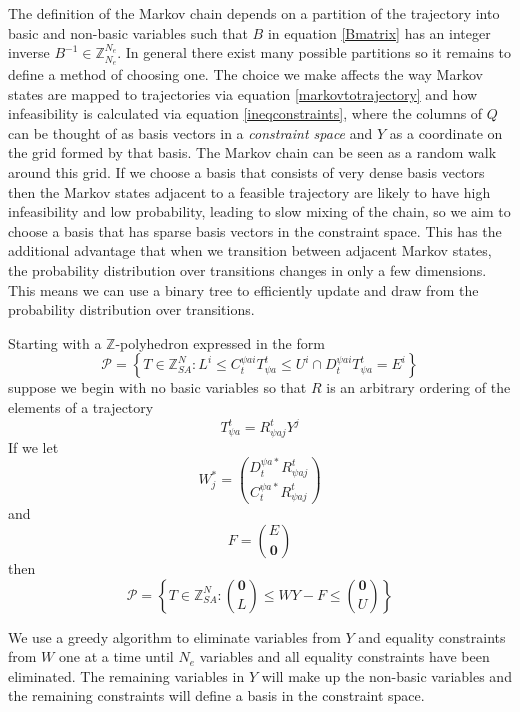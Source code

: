 \documentclass{article}
\begin{document}
The definition of the Markov chain depends on a partition of the trajectory into basic and non-basic variables such that $B$ in equation \eqref{Bmatrix} has an integer inverse $B^{-1} \in \mathbb{Z}^{N_e}_{N_e}$. In general there exist many possible partitions so it remains to define a method of choosing one. The choice we make affects the way Markov states are mapped to trajectories via equation \eqref{markovtotrajectory} and how infeasibility is calculated via equation \eqref{ineqconstraints}, where the columns of $Q$ can be thought of as basis vectors in a \textit{constraint space} and $Y$ as a coordinate on the grid formed by that basis. The Markov chain can be seen as a random walk around this grid. If we choose a basis that consists of very dense basis vectors then the Markov states adjacent to a feasible trajectory are likely to have high infeasibility and low probability, leading to slow mixing of the chain, so we aim to choose a basis that has sparse basis vectors in the constraint space. This has the additional advantage that when we transition between adjacent Markov states, the probability distribution over transitions changes in only a few dimensions. This means we can use a binary tree to efficiently update and draw from the probability distribution over transitions\cite{TangMutableCategorical}.

Starting with a $\mathbb{Z}$-polyhedron expressed in the form
\[
\mathcal{P} = \left\{T \in \mathbb{Z}^N_{SA}: L^i \le C^{\psi ai}_t T^t_{\psi a} \le U^i \cap D^{\psi ai}_t T^t_{\psi a} = E^i \right\}
\]
suppose we begin with no basic variables so that $R$ is an arbitrary ordering of the elements of a trajectory
\[
T^t_{\psi a} = R^t_{\psi a j}Y^j
\]
If we let
\[
W^*_j = {D^{\psi a*}_t R^t_{\psi aj} \choose C^{\psi a*}_t R^t_{\psi aj}}
\]
and
\[
F = {E \choose \mathbf{0}}
\]
then
\begin{equation}
\mathcal{P} = \left\{T \in \mathbb{Z}^N_{SA}: {\mathbf{0} \choose L} \le W Y - F \le {\mathbf{0} \choose U} \right\}
\label{jointconstraints}
\end{equation}

We use a greedy algorithm to eliminate variables from $Y$ and equality constraints from $W$ one at a time until $N_e$ variables and all equality constraints have been eliminated. The remaining variables in $Y$ will make up the non-basic variables and the remaining constraints will define a basis in the constraint space.
\end{document}

